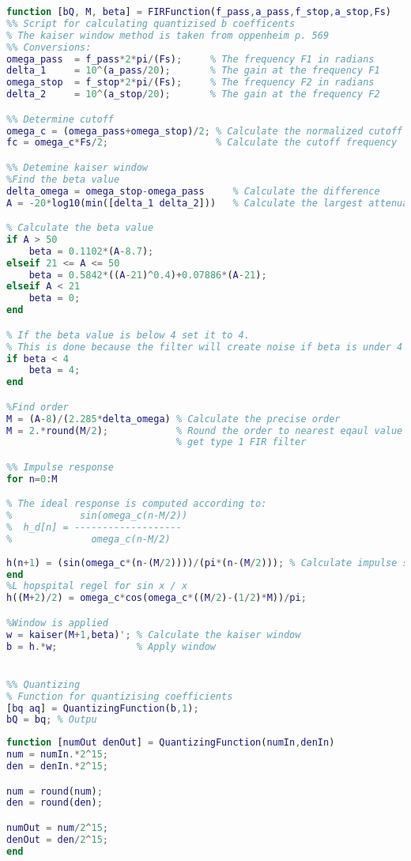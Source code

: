 \begin{lstlisting}[language=Matlab, caption = {Matlab script for FIR coefficients},label={ls:matlabFirFunction}]
function [bQ, M, beta] = FIRFunction(f_pass,a_pass,f_stop,a_stop,Fs)
%% Script for calculating quantizised b coefficents 
% The kaiser window method is taken from oppenheim p. 569
%% Conversions:
omega_pass  = f_pass*2*pi/(Fs);     % The frequency F1 in radians
delta_1     = 10^(a_pass/20);       % The gain at the frequency F1
omega_stop  = f_stop*2*pi/(Fs);     % The frequency F2 in radians
delta_2     = 10^(a_stop/20);       % The gain at the frequency F2

%% Determine cutoff
omega_c = (omega_pass+omega_stop)/2; % Calculate the normalized cutoff 
fc = omega_c*Fs/2;                   % Calculate the cutoff frequency

%% Detemine kaiser window
%Find the beta value
delta_omega = omega_stop-omega_pass     % Calculate the difference
A = -20*log10(min([delta_1 delta_2]))   % Calculate the largest attenuation 

% Calculate the beta value
if A > 50 
    beta = 0.1102*(A-8.7);
elseif 21 <= A <= 50 
    beta = 0.5842*((A-21)^0.4)+0.07886*(A-21);
elseif A < 21
    beta = 0;
end

% If the beta value is below 4 set it to 4.
% This is done because the filter will create noise if beta is under 4
if beta < 4
    beta = 4;
end

%Find order
M = (A-8)/(2.285*delta_omega) % Calculate the precise order
M = 2.*round(M/2);            % Round the order to nearest eqaul value to
                              % get type 1 FIR filter

%% Impulse response
for n=0:M

% The ideal response is computed according to:
%            sin(omega_c(n-M/2)) 
%  h_d[n] = -------------------
%              omega_c(n-M/2)
 
h(n+1) = (sin(omega_c*(n-(M/2))))/(pi*(n-(M/2))); % Calculate impulse samples
end
%L hopspital regel for sin x / x
h((M+2)/2) = omega_c*cos(omega_c*((M/2)-(1/2)*M))/pi;

%Window is applied
w = kaiser(M+1,beta)'; % Calculate the kaiser window 
b = h.*w;              % Apply window


%% Quantizing
% Function for quantizising coefficients
[bq aq] = QuantizingFunction(b,1); 
bQ = bq; % Outpu
\end{lstlisting}

\begin{lstlisting}[language=Matlab, caption = {Matlab script for quantisizing FIR coefficients},label={ls:quan}]
function [numOut denOut] = QuantizingFunction(numIn,denIn)
num = numIn.*2^15;
den = denIn.*2^15;

num = round(num);
den = round(den);

numOut = num/2^15;
denOut = den/2^15;
end
\end{lstlisting}